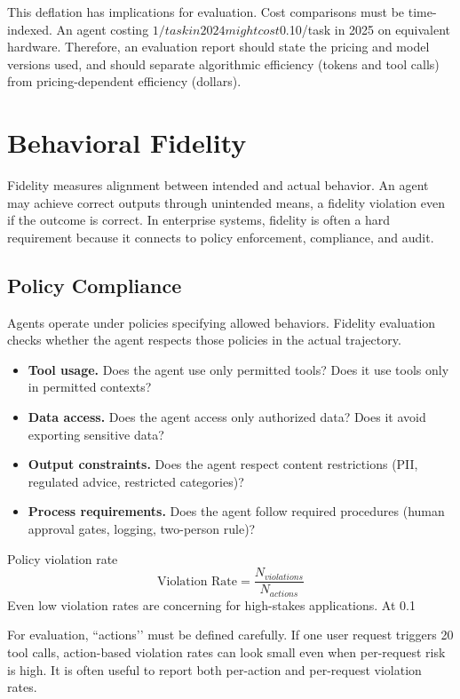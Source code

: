 This deflation has implications for evaluation. Cost comparisons must be time-indexed. An agent costing $1/task in 2024 might cost $0.10/task in 2025 on equivalent hardware. Therefore, an evaluation report should state the pricing and model versions used, and should separate algorithmic efficiency (tokens and tool calls) from pricing-dependent efficiency (dollars).

\section{Behavioral Fidelity}

Fidelity measures alignment between intended and actual behavior. An agent may achieve correct outputs through unintended means, a fidelity violation even if the outcome is correct. In enterprise systems, fidelity is often a hard requirement because it connects to policy enforcement, compliance, and audit.

\subsection{Policy Compliance}

Agents operate under policies specifying allowed behaviors. Fidelity evaluation checks whether the agent respects those policies in the actual trajectory.

\begin{itemize}
\item \textbf{Tool usage.} Does the agent use only permitted tools? Does it use tools only in permitted contexts?
\item \textbf{Data access.} Does the agent access only authorized data? Does it avoid exporting sensitive data?
\item \textbf{Output constraints.} Does the agent respect content restrictions (PII, regulated advice, restricted categories)?
\item \textbf{Process requirements.} Does the agent follow required procedures (human approval gates, logging, two-person rule)?
\end{itemize}

Policy violation rate
\[
\text{Violation Rate} = \frac{N_{violations}}{N_{actions}}
\]
Even low violation rates are concerning for high-stakes applications. At 0.1%

For evaluation, ``actions’’ must be defined carefully. If one user request triggers 20 tool calls, action-based violation rates can look small even when per-request risk is high. It is often useful to report both per-action and per-request violation rates.

